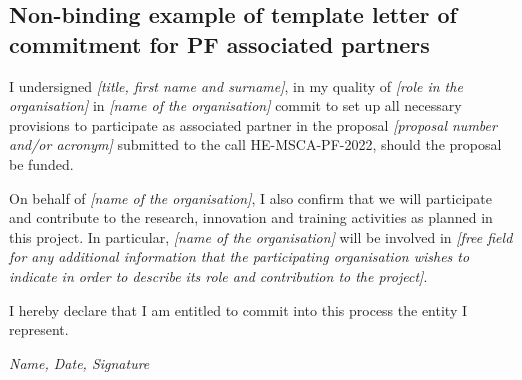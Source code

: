\documentclass[11pt,draftproposal]{msca-pf}
\begin{document}
\subsection*{Non-binding example of template letter of commitment for PF associated partners}

I undersigned \emph{[title, first name and surname]}, in my quality of
\emph{[role in the organisation]} in \emph{[name of the organisation]} commit
to set up all necessary provisions to participate as associated partner in the
proposal \emph{[proposal number and/or acronym]} submitted to the call
HE-MSCA-PF-2022, should the proposal be funded.

On behalf of \emph{[name of the organisation]}, I also confirm that we will
participate and contribute to the research, innovation and training activities
as planned in this project. In particular, \emph{[name of the organisation]}
will be involved in \emph{[free field for any additional information that the
participating organisation wishes to indicate in order to describe its role and
contribution to the project]}.

I hereby declare that I am entitled to commit into this process the entity I represent.

\hfill \emph{Name, Date, Signature}
\end{document}
